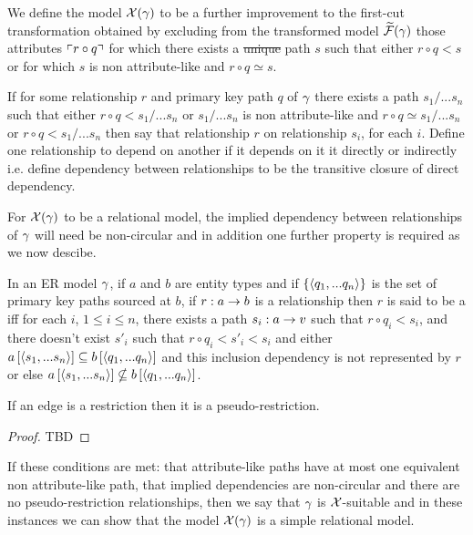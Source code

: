 We define the model $\mathcal{X}(\gamma)$ to be a further improvement to the first-cut transformation obtained by excluding  from  the transformed model $\mathcal{\widetilde{F}}(\gamma)$ those attributes $\left\ulcorner r \circ q\right\urcorner$ for which there exists a \sout{unique}  path $s$ such that  either  $r \circ q < s$ or for which $s$ is non attribute-like and $r \circ q \simeq s$. 

\begin{definition}
If for some relationship $r$ and primary key path $q$ of $\gamma$ there exists a  path $s_1/...s_n$ such that either   $r \circ q < s_1/...s_n$ or $s_1/...s_n$ is non attribute-like and $r \circ q \simeq s_1/...s_n$ or $r \circ q < s_1/...s_n$ then say that relationship $r$  on relationship $s_i$,
for each $i$. Define one relationship to depend on another if it depends on it it directly or indirectly i.e. define dependency between relationships to be the transitive closure of direct dependency.
\end{definition}

For $\mathcal{X}(\gamma)$ to be a relational model, the implied dependency between relationships of $\gamma$ will need be non-circular
and in addition one further property is required as we now descibe.


\begin{definition}
In an  ER model $\gamma$, if $a$ and $b$ are entity types and if $\left\{\langle q_1,...q_n\rangle\right\}$ is the set of primary key paths sourced at $b$, if $r: a \rightarrow b$ is a relationship then $r$ is said to be a 
iff for each $i$, $1 \leq i \leq n$, there exists a path $s_i: a \rightarrow v$ such that $r \circ q_i < s_i$,
and there doesn't exist $s'_i$ such that $r \circ q_i < s'_i <s_i$ and  either
$a\left[\langle s_1,...s_n\rangle\right]\subseteq b\left[\langle q_1,...q_n\rangle\right]$ and this inclusion dependency is not  represented by
$r$ or else $a\left[\langle s_1,...s_n\rangle\right]\nsubseteq b\left[\langle q_1,...q_n\rangle\right]$.
\end{definition}

\begin{lemma}
If an edge is a restriction then it is a pseudo-restriction.
\end{lemma}
\begin{proof}
TBD
\end{proof}

If these conditions are met: that attribute-like paths have at most one equivalent non attribute-like path, that implied dependencies are non-circular and there are no pseudo-restriction relationships, then we say that $\gamma$ is $\mathcal{X}$-suitable and in these instances we can show that 
the model $\mathcal{X}(\gamma)$ is a simple relational model. 

